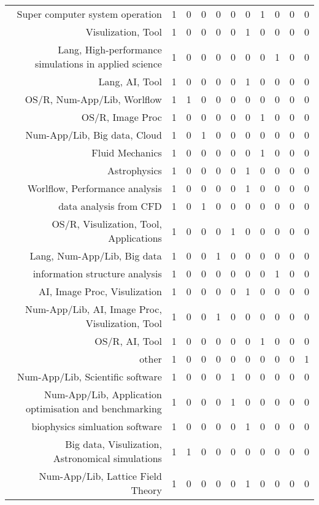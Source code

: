 {\begin{landscape}
\begin{longtable}[htb]{r|c|c|c|c|c|c|c|c|c|c}
{Super computer system operation} & 1 & 0 & 0 & 0 & 0 & 0 & 1 & 0 & 0 & 0 \\%
{Visulization, Tool} & 1 & 0 & 0 & 0 & 0 & 1 & 0 & 0 & 0 & 0 \\%
{Lang, High-performance simulations in applied science} & 1 & 0 & 0 & 0 & 0 & 0 & 0 & 1 & 0 & 0 \\%
{Lang, AI, Tool} & 1 & 0 & 0 & 0 & 0 & 1 & 0 & 0 & 0 & 0 \\%
{OS/R, Num-App/Lib, Worlflow} & 1 & 1 & 0 & 0 & 0 & 0 & 0 & 0 & 0 & 0 \\%
{OS/R, Image Proc} & 1 & 0 & 0 & 0 & 0 & 0 & 1 & 0 & 0 & 0 \\%
{Num-App/Lib, Big data, Cloud} & 1 & 0 & 1 & 0 & 0 & 0 & 0 & 0 & 0 & 0 \\%
{Fluid Mechanics} & 1 & 0 & 0 & 0 & 0 & 0 & 1 & 0 & 0 & 0 \\%
{Astrophysics} & 1 & 0 & 0 & 0 & 0 & 1 & 0 & 0 & 0 & 0 \\%
{Worlflow, Performance analysis} & 1 & 0 & 0 & 0 & 0 & 1 & 0 & 0 & 0 & 0 \\%
{data analysis from CFD} & 1 & 0 & 1 & 0 & 0 & 0 & 0 & 0 & 0 & 0 \\%
{OS/R, Visulization, Tool, Applications} & 1 & 0 & 0 & 0 & 1 & 0 & 0 & 0 & 0 & 0 \\%
{Lang, Num-App/Lib, Big data} & 1 & 0 & 0 & 1 & 0 & 0 & 0 & 0 & 0 & 0 \\%
{information structure analysis} & 1 & 0 & 0 & 0 & 0 & 0 & 0 & 1 & 0 & 0 \\%
{AI, Image Proc, Visulization} & 1 & 0 & 0 & 0 & 0 & 1 & 0 & 0 & 0 & 0 \\%
{Num-App/Lib, AI, Image Proc, Visulization, Tool} & 1 & 0 & 0 & 1 & 0 & 0 & 0 & 0 & 0 & 0 \\%
{OS/R, AI, Tool} & 1 & 0 & 0 & 0 & 0 & 0 & 1 & 0 & 0 & 0 \\%
{other} & 1 & 0 & 0 & 0 & 0 & 0 & 0 & 0 & 0 & 1 \\%
{Num-App/Lib, Scientific software} & 1 & 0 & 0 & 0 & 1 & 0 & 0 & 0 & 0 & 0 \\%
{Num-App/Lib, Application optimisation and benchmarking} & 1 & 0 & 0 & 0 & 1 & 0 & 0 & 0 & 0 & 0 \\%
{biophysics simluation software} & 1 & 0 & 0 & 0 & 0 & 1 & 0 & 0 & 0 & 0 \\%
{Big data, Visulization, Astronomical simulations} & 1 & 1 & 0 & 0 & 0 & 0 & 0 & 0 & 0 & 0 \\%
{Num-App/Lib, Lattice Field Theory} & 1 & 0 & 0 & 0 & 0 & 1 & 0 & 0 & 0 & 0 \\%

\end{longtable}
\end{landscape}}

